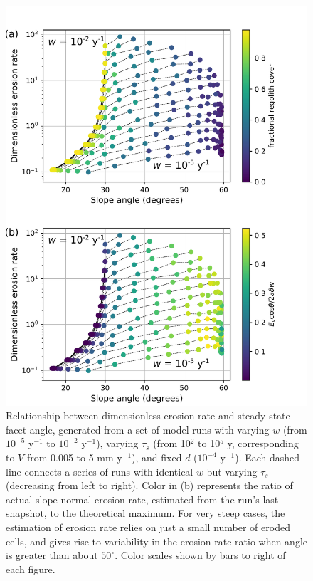 \begin{figure}[ht!]
\centerline{\includegraphics[scale=0.75]{Figures/ero_rate_vs_slope_angle.pdf}}
\caption{Relationship between dimensionless erosion rate and steady-state facet angle, generated from a set of model runs with varying $w$ (from $10^{-5}$ y$^{-1}$ to $10^{-2}$ y$^{-1}$), varying $\tau_s$ (from 10$^2$ to 10$^5$ y, corresponding to $V$ from 0.005 to 5 mm y$^{-1}$), and fixed $d$ ($10^{-4}$ y$^{-1}$). Each dashed line connects a series of runs with identical $w$ but varying $\tau_s$ (decreasing from left to right). Color in (b) represents the ratio of actual slope-normal erosion rate, estimated from the run's last snapshot, to the theoretical maximum. For very steep cases, the estimation of erosion rate relies on just a small number of eroded cells, and gives rise to variability in the erosion-rate ratio when angle is greater than about $50^\circ$. Color scales shown by bars to right of each figure.}
\label{fig:eroslope}
\end{figure}

